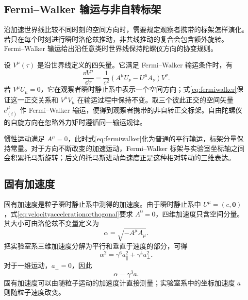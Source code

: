 \documentclass[style=classic,color=full]{lc-article}
\begin{document}
\subsection{Fermi--Walker 输运与非自转标架}

沿加速世界线比较不同时刻的空间方向时，需要规定观察者携带的标架怎样演化。若只在每个时刻进行瞬时洛伦兹推动，非共线推动的复合会包含额外旋转。Fermi--Walker 输运给出沿任意类时世界线保持陀螺仪方向的协变规则。

设 $V^\mu(\tau)$ 是沿世界线定义的四矢量。它满足 Fermi--Walker 输运条件时，有
\begin{equation}
  \boxed{
  \frac{\dd V^\mu}{\dd\tau}
  =\frac{1}{c^2}
  \left(A^\mu U_\nu-U^\mu A_\nu\right)V^\nu.}
  \label{eq:fermiwalker}
\end{equation}
若 $V^\mu U_\mu=0$，它在观察者瞬时静止系中表示一个空间方向；式\eqref{eq:fermiwalker}保证这一正交关系和 $V^\mu V_\mu$ 在输运过程中保持不变。取三个彼此正交的空间矢量 $e_{(i)}^\mu$ 作 Fermi--Walker 输运，便得到观察者携带的非自转正交标架。自由陀螺仪的自旋方向在忽略外力矩时遵循同一输运规律。

惯性运动满足 $A^\mu=0$，此时式\eqref{eq:fermiwalker}化为普通的平行输运，标架分量保持常量。对于方向不断改变的加速运动，Fermi--Walker 标架与实验室坐标轴之间会积累托马斯旋转；后文的托马斯进动角速度正是这种相对转动的三维表达\cite{rindler,landau}。

\subsection{固有加速度}

固有加速度是粒子瞬时静止系中测得的加速度。由于瞬时静止系中 $U^\mu=(c,\bm0)$，式\eqref{eq:velocityaccelerationorthogonal}要求 $A^0=0$，四维加速度只含空间分量。其大小可由洛伦兹不变量定义为
\begin{equation}
  \boxed{\alpha=\sqrt{-A^\mu A_\mu}.}
  \label{eq:properacceleration}
\end{equation}
把实验室系三维加速度分解为平行和垂直于速度的部分，可得
\begin{equation}
  \alpha^2
  =\gamma^6a_{\parallel}^2
  +\gamma^4a_{\perp}^2.
  \label{eq:properaccelerationcomponents}
\end{equation}
对于一维运动，$a_\perp=0$，因此
\begin{equation}
  \boxed{\alpha=\gamma^3a.}
  \label{eq:properacceleration1d}
\end{equation}
固有加速度可以由随粒子运动的加速度计直接测量；实验室系中的坐标加速度 $a$ 则随粒子速度改变。
\end{document}
